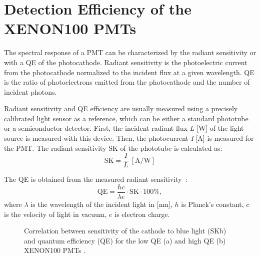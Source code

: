 \section{Detection Efficiency of the XENON100 PMTs}
\label{secQE}

The spectral response of a PMT can be characterized by the radiant sensitivity or with a QE of the photocathode. 
Radiant sensitivity is the photoelectric current from the photocathode normalized to the incident flux at a given wavelength. QE is the ratio of photoelectrons emitted from the photocathode and the number of incident photons.

Radiant sensitivity and QE efficiency are usually measured using a precisely calibrated light sensor as a reference, which can be either a standard phototube or a semiconductor detector. First, the incident radiant flux {\it L} [W] of the light source is measured with this device. Then, the photocurrent {\it I} [A] is measured for the PMT. The radiant sensitivity SK of the phototube is calculated as:
\begin{equation}
\mathrm{SK} = \frac{I}{L}\ \mathrm{[A/W]}
\end{equation}
 
The QE is obtained from the measured radiant sensitivity~\cite{HamamatsuHandbook}:
\begin{equation}
\mathrm{QE} = \frac{h c}{\lambda e}\cdot \mathrm{SK}\cdot \text{100\%},
\end{equation}
where $\lambda$ is the wavelength of the incident light in [nm], $h$ is Planck's constant, $c$ is  the velocity of light in vacuum, $e$ is electron charge.

\begin{figure}[!b]
\centering
{}
\caption[Correlation between sensitivity of the cathode to blue light (SKb) and quantum efficiency (QE) for the XENON100 PMTs]{Correlation between sensitivity of the cathode to blue light (SKb) and quantum efficiency (QE) for the low QE (a)  and high QE (b) XENON100 PMTs \cite{PMTmassModel}.}
\label{figSKBvsQE}
\end{figure}

